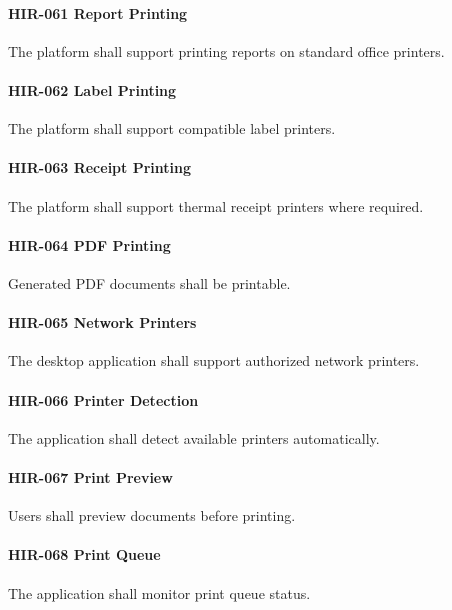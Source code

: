 \paragraph{HIR-061 Report Printing}

The platform shall support printing reports on standard office printers.

\paragraph{HIR-062 Label Printing}

The platform shall support compatible label printers.

\paragraph{HIR-063 Receipt Printing}

The platform shall support thermal receipt printers where required.

\paragraph{HIR-064 PDF Printing}

Generated PDF documents shall be printable.

\paragraph{HIR-065 Network Printers}

The desktop application shall support authorized network printers.

\paragraph{HIR-066 Printer Detection}

The application shall detect available printers automatically.

\paragraph{HIR-067 Print Preview}

Users shall preview documents before printing.

\paragraph{HIR-068 Print Queue}

The application shall monitor print queue status.

